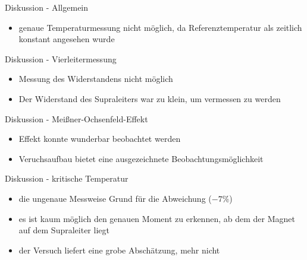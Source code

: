 \begin{frame}{Diskussion - Allgemein}
  \begin{itemize}
    \item{ genaue Temperaturmessung nicht möglich, da Referenztemperatur als zeitlich konstant angesehen wurde}
  \end{itemize}
\end{frame}

\begin{frame}{Diskussion - Vierleitermessung}
  \begin{itemize}
    \item{Messung des Widerstandens nicht möglich}
    \item {Der Widerstand des Supraleiters war zu klein, um vermessen zu werden}
\end{itemize}
\end{frame}

\begin{frame}{Diskussion - Meißner-Ochsenfeld-Effekt}
  \begin{itemize}
    \item{ Effekt konnte wunderbar beobachtet werden}
    \item{ Veruchsaufbau bietet eine ausgezeichnete Beobachtungsmöglichkeit}
\end{itemize}
\end{frame}

\begin{frame} {Diskussion - kritische Temperatur}
  \begin{itemize}
    \item{die ungenaue Messweise Grund für die Abweichung ($-7\%$)}
    \item{es ist kaum möglich den genauen Moment zu erkennen, ab dem der Magnet auf dem Supraleiter liegt}
    \item{der Versuch liefert eine grobe Abschätzung, mehr nicht}
  \end{itemize}
\end{frame}
